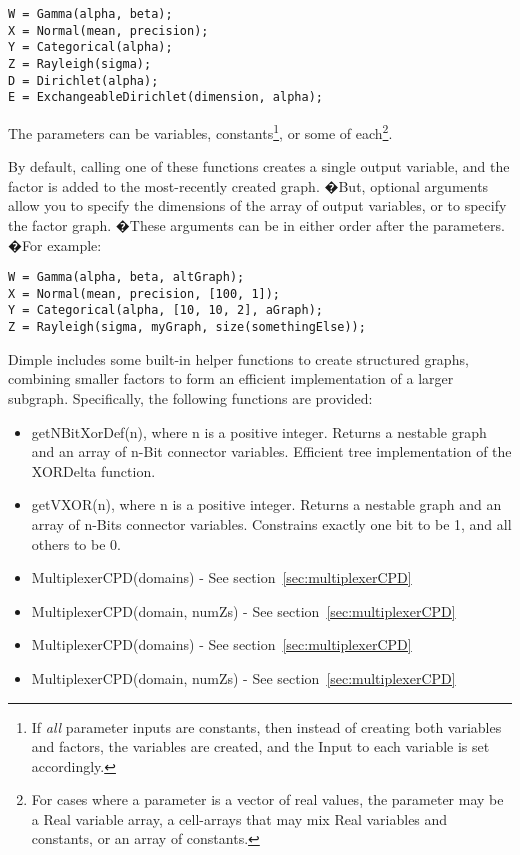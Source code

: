 \begin{lstlisting}
W = Gamma(alpha, beta);
X = Normal(mean, precision);
Y = Categorical(alpha);
Z = Rayleigh(sigma);
D = Dirichlet(alpha);
E = ExchangeableDirichlet(dimension, alpha);
\end{lstlisting}


The parameters can be variables, constants\footnote{If \emph{all} parameter inputs are constants, then instead of creating both variables and factors, the variables are created, and the Input to each variable is set accordingly.}, or some of each\footnote{For cases where a parameter is a vector of real values, the parameter may be a Real variable array, a cell-arrays that may mix Real variables and constants, or an array of constants.}.

By default, calling one of these functions creates a single output variable, and the factor is added to the most-recently created graph. �But, optional arguments allow you to specify the dimensions of the array of output variables, or to specify the factor graph. �These arguments can be in either order after the parameters. �For example:

\begin{lstlisting}
W = Gamma(alpha, beta, altGraph);
X = Normal(mean, precision, [100, 1]);
Y = Categorical(alpha, [10, 10, 2], aGraph);
Z = Rayleigh(sigma, myGraph, size(somethingElse));
\end{lstlisting}

\fi


Dimple includes some built-in helper functions to create structured graphs, combining smaller factors to form an efficient implementation of a larger subgraph.  Specifically, the following functions are provided:

\ifmatlab
\begin{itemize}
\item getNBitXorDef(n), where n is a positive integer. Returns a nestable graph and an array of n-Bit connector variables. Efficient tree implementation of the XORDelta function.
\item getVXOR(n), where n is a positive integer. Returns a nestable graph and an array of n-Bits connector variables. Constrains exactly one bit to be 1, and all others to be 0.
\item MultiplexerCPD(domains) - See section~\ref{sec:multiplexerCPD}
\item MultiplexerCPD(domain, numZs) - See section~\ref{sec:multiplexerCPD}
\end{itemize}
\fi

\ifjava
\begin{itemize}
\item MultiplexerCPD(domains) - See section~\ref{sec:multiplexerCPD}
\item MultiplexerCPD(domain, numZs) - See section~\ref{sec:multiplexerCPD}
\end{itemize}
\fi

